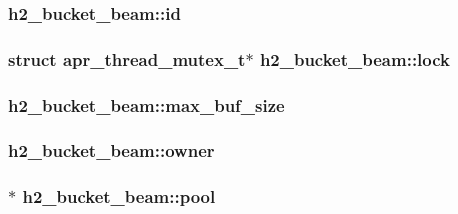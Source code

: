 \subsubsection[{\texorpdfstring{id}{id}}]{ h2\+\_\+bucket\+\_\+beam\+::id}\hypertarget{structh2__bucket__beam_a1db363a58592968137a74e201e6f0cbd}{}\label{structh2__bucket__beam_a1db363a58592968137a74e201e6f0cbd}
\subsubsection[{\texorpdfstring{lock}{lock}}]{\setlength{\rightskip}{0pt plus 5cm}struct {\bf apr\+\_\+thread\+\_\+mutex\+\_\+t}$\ast$ h2\+\_\+bucket\+\_\+beam\+::lock}\hypertarget{structh2__bucket__beam_adc21448d563ff6cf1de7576e1d2a4254}{}\label{structh2__bucket__beam_adc21448d563ff6cf1de7576e1d2a4254}
\subsubsection[{\texorpdfstring{max\+\_\+buf\+\_\+size}{max_buf_size}}]{ h2\+\_\+bucket\+\_\+beam\+::max\+\_\+buf\+\_\+size}\hypertarget{structh2__bucket__beam_a834617c8352877538dbae28da65cb464}{}\label{structh2__bucket__beam_a834617c8352877538dbae28da65cb464}
\subsubsection[{\texorpdfstring{owner}{owner}}]{ h2\+\_\+bucket\+\_\+beam\+::owner}\hypertarget{structh2__bucket__beam_a6e809164f212ba83914fd0e9c718f8b8}{}\label{structh2__bucket__beam_a6e809164f212ba83914fd0e9c718f8b8}
\subsubsection[{\texorpdfstring{pool}{pool}}]{$\ast$ h2\+\_\+bucket\+\_\+beam\+::pool}\hypertarget{structh2__bucket__beam_a12dbf9e2adca7f75e8b31e94077ff380}{}\label{structh2__bucket__beam_a12dbf9e2adca7f75e8b31e94077ff380}
